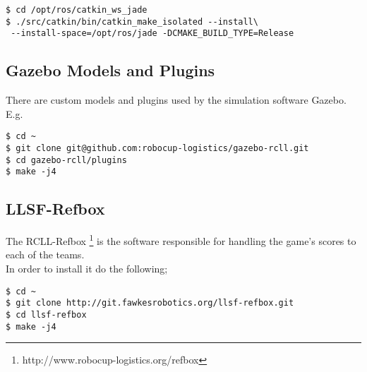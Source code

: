 \documentclass[oribibl]{llncs}
\begin{document}
\begin{lstlisting}[frame=single]
$ cd /opt/ros/catkin_ws_jade
$ ./src/catkin/bin/catkin_make_isolated --install\
 --install-space=/opt/ros/jade -DCMAKE_BUILD_TYPE=Release
\end{lstlisting}

\subsection{Gazebo Models and Plugins}
There are custom models and plugins used by the simulation software Gazebo. E.g. 
\begin{lstlisting}[frame=single]
$ cd ~
$ git clone git@github.com:robocup-logistics/gazebo-rcll.git
$ cd gazebo-rcll/plugins
$ make -j4
\end{lstlisting}

\subsection{LLSF-Refbox}
The RCLL-Refbox \footnote{http://www.robocup-logistics.org/refbox} is the software responsible for handling the game's scores to each of the teams.\\
In order to install it do the following;
\begin{lstlisting}[frame=single]
$ cd ~
$ git clone http://git.fawkesrobotics.org/llsf-refbox.git
$ cd llsf-refbox
$ make -j4
\end{lstlisting}
\end{document}
